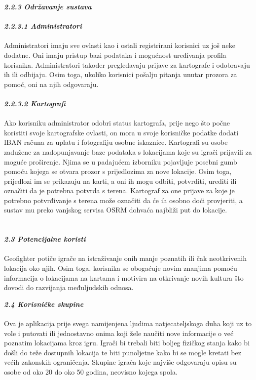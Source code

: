 		
		\textbf{\textit{2.2.3 Održavanje sustava}}\\ \\ 
		\textbf{\textit{\small2.2.3.1 Administratori}}\\ \\
		{Administratori imaju sve ovlasti kao i ostali registrirani korisnici uz još neke dodatne. Oni imaju pristup bazi podataka i mogućnost uređivanja profila korisnika. Administratori također pregledavaju prijave za kartografe i odobravaju ih ili odbijaju. Osim toga, ukoliko korisnici pošalju pitanja unutar prozora za pomoć, oni na njih odgovaraju.}\\
		
		\textbf{\textit{\\ \small2.2.3.2 Kartografi}}\\ \\
		{Ako korisniku administrator odobri status kartografa, prije nego što počne koristiti svoje kartografske ovlasti, on mora u svoje korisničke podatke dodati IBAN računa za uplatu i fotografiju osobne iskaznice. Kartografi su osobe zadužene za nadopunjavanje baze podataka s lokacijama koje su igrači prijavili za moguće proširenje. Njima se u padajućem izborniku pojavljuje posebni gumb pomoću kojega se otvara prozor s prijedlozima za nove lokacije. Osim toga, prijedlozi im se prikazuju na karti, a oni ih mogu odbiti, potvrditi, urediti ili označiti da je potrebna potvrda s terena. Kartograf za one prijave za koje je potrebno potvrđivanje s terena može označiti da će ih osobno doći provjeriti, a sustav mu preko vanjskog servisa OSRM dohvaća najbliži put do lokacije.}
		\\ \\ \\ 
		
		\textbf{\textit{\large 2.3 Potencijalne koristi}}\\ \\ 
		{Geofighter potiče igrače na istraživanje onih manje poznatih ili čak neotkrivenih lokacija oko njih. Osim toga, korisnika se obogaćuje novim znanjima pomoću informacija o lokacijama na kartama i motivira na otkrivanje novih kultura što dovodi do razvijanja međuljudskih odnosa.} \newpage
		
		\textbf{\textit{\large 2.4 Korisničke skupine}}\\ \\ 
		{Ova je aplikacija prije svega namijenjena ljudima natjecateljskoga duha koji uz to vole i putovati ili jednostavno onima koji žele naučiti nove informacije o već poznatim lokacijama kroz igru. Igrači bi trebali biti boljeg fizičkog stanja kako bi došli do teže dostupnih lokacija te biti punoljetne kako bi se mogle kretati bez većih zakonskih ograničenja. Skupine igrača koje najviše odgovaraju opisu su osobe od oko 20 do oko 50 godina, neovisno kojega spola.}\\ \\
		

